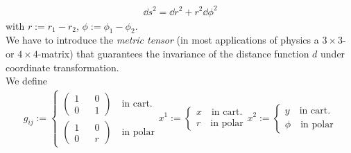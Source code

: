 \begin{align}
    \dd{s}^2 = \dd{r}^2 + r^2 \dd{\phi}^2 
\end{align}
with $r:= r_{1} - r_{2}$, $\phi := \phi_{1} - \phi_{2}$. \\
\noindent We have to introduce the \textit{metric tensor} (in most applications of physics a $3 \times 3$- or $4 \times 4$-matrix) that guarantees the invariance of the distance function $d$ under coordinate transformation. \\
We define 
\begin{align}
    g_{ij} := \begin{cases} \begin{pmatrix} 1 && 0 \\ 0 && 1 \end{pmatrix} \quad \text{in cart.} \\  \begin{pmatrix} 1 && 0 \\ 0 && r \end{pmatrix} \quad \text{in polar} \end{cases} x^{1} := \begin{cases} x \quad \text{in cart.} \\ r \quad \text{in polar} \end{cases}  x^{2} := \begin{cases} y \quad \text{in cart.} \\ \phi \quad \text{in polar} \end{cases}
\end{align}

